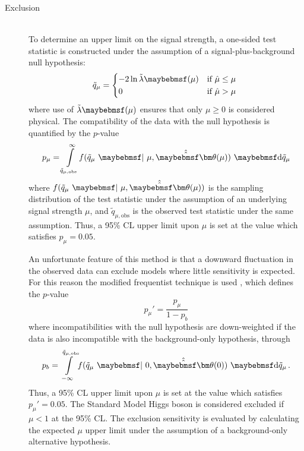 \begin{description}
\item[Exclusion] \hfill \\
	To determine an upper limit on the signal strength, a one-sided test statistic is 
	constructed under the assumption of a signal-plus-background null hypothesis:
	\begin{equation}
		\tilde{q}_{\mu} = 
		\begin{dcases*}
			-2 \ln \tilde{\lambda}\parenths{\mu} & if $\hat{\mu} \leq \mu$ \\
			0 & if $\hat{\mu} > \mu$
		\end{dcases*}
	\end{equation}
	where use of $\tilde{\lambda}\parenths{\mu}$ ensures that only $\mu \geq 0$ is 
	considered physical. The compatibility of the data with the null hypothesis is 
	quantified by the $p$-value
	\begin{equation}
		p_{\mu} = \int\limits_{\tilde{q}_{\mu,\text{obs}}}^{\infty} \! f(\tilde{q}_{\mu}~\given~\mu, \hat{\hat{\bvec{\theta}}}(\mu)) \,\, \d{\tilde{q}_{\mu}}
	\end{equation}
	where $f(\tilde{q}_{\mu}~\given~\mu, \hat{\hat{\bvec{\theta}}}(\mu))$ is the sampling 
	distribution of the test statistic under the assumption of an underlying signal strength 
	$\mu$, and $\tilde{q}_{\mu,\text{obs}}$ is the observed test statistic under the same 
	assumption. Thus, a 95\% CL upper limit upon $\mu$ is set at the value which satisfies 
	$p_{\mu} = 0.05$.

	An unfortunate feature of this method is that a downward fluctuation in the observed 
	data can exclude models where little sensitivity is expected. For this reason the 
	modified frequentist \CLs technique is used \cite{Junk:CLs,Read:CLs}, which defines the 
	$p$-value
	\begin{equation}
		p_{\mu}' = \frac{p_{\mu}}{1 - p_{b}}
	\end{equation}
	where incompatibilities with the null hypothesis are down-weighted if the data is also 
	incompatible with the background-only hypothesis, through
	\begin{equation}
		p_{b} = \int\limits_{-\infty}^{\tilde{q}_{\mu,\text{obs}}} \! f(\tilde{q}_{\mu}~\given~0, \hat{\hat{\bvec{\theta}}}(0)) \,\, \d{\tilde{q}_{\mu}} \,.
	\end{equation}
	Thus, a 95\% CL upper limit upon $\mu$ is set at the value which satisfies 
	$p_{\mu}' = 0.05$. The Standard Model Higgs boson is considered excluded if $\mu < 1$ at 
	the 95\% CL. The exclusion sensitivity is evaluated by calculating the expected $\mu$ 
	upper limit under the assumption of a background-only alternative hypothesis.


\end{description}
